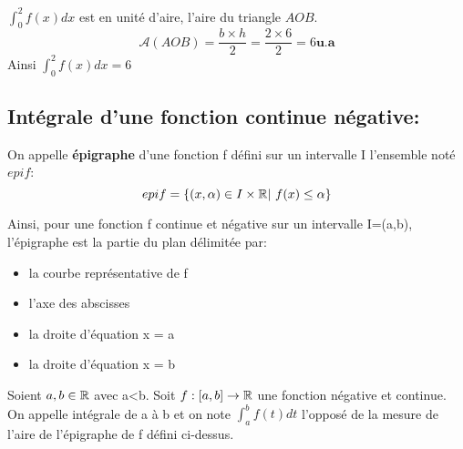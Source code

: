 \begin{minipage}{0.45\linewidth}
  \begin{center}
  \end{center}
\end{minipage}
\hfill
\begin{minipage}{0.45\linewidth}
  $\int_0^2 f(x)dx$ est en unité d'aire, l'aire du triangle $AOB$.
  \[
    \mathcal{A}(AOB) = \frac{b \times h}{2} = \frac{2 \times 6}{2} = 6 \mathbf{u.a}
  \]
  Ainsi $\int_0^2 f(x)dx = 6$
\end{minipage}
\subsection{Intégrale d'une fonction continue négative: }
\begin{mydef}
  On appelle \textbf{épigraphe} d'une fonction f défini sur un
  intervalle I l'ensemble noté $epi f$:
  \[
    epi f = \{ (x,\alpha) \in I \times \mathbb{R} | ~f(x) \leq \alpha \}
  \]
\end{mydef}

Ainsi, pour une fonction f continue et négative sur un intervalle I=(a,b),
l'épigraphe est la partie du plan délimitée par:
\begin{itemize}
\item la courbe représentative de f
\item l'axe des abscisses
\item la droite d'équation x = a
\item la droite d'équation x = b
\end{itemize}

\begin{mydef}
  Soient $a,b \in \mathbb{R}$ avec a<b. Soit $f:[a,b] \to \mathbb{R}$  une fonction
  négative et continue. On appelle intégrale de a à b et on note
  $\int_a^b f(t) dt$ l'opposé de la mesure de l'aire de l'épigraphe de f défini
  ci-dessus. 
\end{mydef} 

